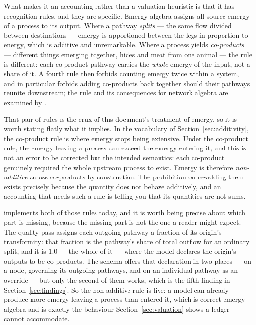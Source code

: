 \documentclass[11pt,a4paper]{article}
\begin{document}
What makes it an accounting rather than a valuation heuristic is that it has recognition rules, and they are specific. Emergy algebra assigns all source emergy of a process to its output. Where a pathway \emph{splits} --- the same flow divided between destinations --- emergy is apportioned between the legs in proportion to energy, which is additive and unremarkable. Where a process yields \emph{co-products} --- different things emerging together, hides and meat from one animal --- the rule is different: each co-product pathway carries the \emph{whole} emergy of the input, not a share of it. A fourth rule then forbids counting emergy twice within a system, and in particular forbids adding co-products back together should their pathways reunite downstream; the rule and its consequences for network algebra are examined by \citet{brown1996}.

That pair of rules is the crux of this document's treatment of emergy, so it is worth stating flatly what it implies. In the vocabulary of Section~\ref{sec:additivity}, the co-product rule is where emergy stops being extensive. Under the co-product rule, the emergy leaving a process can exceed the emergy entering it, and this is not an error to be corrected but the intended semantics: each co-product genuinely required the whole upstream process to exist. Emergy is therefore \emph{non-additive} across co-products by construction. The prohibition on re-adding them exists precisely because the quantity does not behave additively, and an accounting that needs such a rule is telling you that its quantities are not sums.

\gssk{} implements both of those rules today, and it is worth being precise about which part is missing, because the missing part is not the one a reader might expect. The quality pass assigns each outgoing pathway a fraction of its origin's transformity: that fraction is the pathway's share of total outflow for an ordinary split, and it is $1.0$ --- the whole of it --- where the model declares the origin's outputs to be co-products. The schema offers that declaration in two places --- on a node, governing its outgoing pathways, and on an individual pathway as an override --- but only the second of them works, which is the fifth finding in Section~\ref{sec:findings}. So the non-additive rule is live: a \gssk{} model can already produce more emergy leaving a process than entered it, which is correct emergy algebra and is exactly the behaviour Section~\ref{sec:valuation} shows a ledger cannot accommodate.
\end{document}
